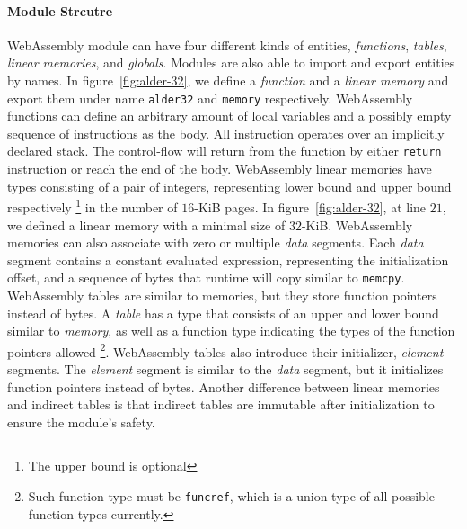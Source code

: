 \paragraph{Module Strcutre} WebAssembly module can have four different kinds of
entities, \emph{functions}, \emph{tables}, \emph{linear memories}, and
\emph{globals}. Modules are also able to import and export entities by names.
In figure~\ref{fig:alder-32}, we define a \emph{function} and a
\emph{linear memory} and export them under name \texttt{alder32} and
\texttt{memory} respectively. WebAssembly functions can define an arbitrary
amount of local variables and a possibly empty sequence of instructions as the
body. All instruction operates over an implicitly declared stack. The
control-flow will return from the function by either \texttt{return} instruction
or reach the end of the body. WebAssembly linear memories have types consisting
of a pair of integers, representing lower bound and upper bound respectively
\footnote{The upper bound is optional} in the number of $16$-KiB pages.
In figure~\ref{fig:alder-32}, at line $21$, we defined a linear memory with a
minimal size of $32$-KiB. WebAssembly memories can also associate with zero or
multiple \emph{data} segments. Each \emph{data} segment contains a constant
evaluated expression, representing the initialization offset, and a sequence of
bytes that runtime will copy similar to \texttt{memcpy}. WebAssembly tables are
similar to memories, but they store function pointers instead of bytes. A
\emph{table} has a type that consists of an upper and lower bound similar to
\emph{memory}, as well as a function type indicating the types of the function
pointers allowed \footnote{Such function type must be \texttt{funcref}, which is
a union type of all possible function types currently.}. WebAssembly tables also
introduce their initializer, \emph{element} segments. The \emph{element} segment
is similar to the \emph{data} segment, but it initializes function pointers
instead of bytes. Another difference between linear memories and indirect tables
is that indirect tables are immutable after initialization to ensure the
module's safety.

